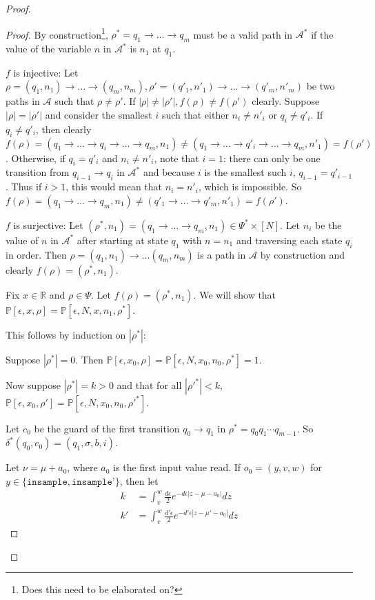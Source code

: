 \documentclass[12pt]{article}
\newcommand{\RR}{\mathbb{R}}
\newcommand{\PP}{\mathbb{P}}
\theoremstyle{definition}
\begin{document}
\begin{proof}
\begin{proof}
	By construction\footnote{Does this need to be elaborated on?}, $\rho^* = q_1\to\ldots\to q_m$ must be a valid path in $\mathcal{A}^*$ if the value of the variable $n$ in $\mathcal{A}^*$ is $n_1$ at $q_1$.

	$f$ is injective: Let $\rho = (q_1, n_1)\to \ldots \to (q_m, n_m), \rho' = (q'_1, n'_1)\to \ldots \to (q'_m, n'_m)$ be two paths in $\mathcal{A}$ such that $\rho \neq \rho'$. If $|\rho| \neq |\rho'|, f(\rho) \neq f(\rho')$ clearly. 
	Suppose $|\rho| = |\rho'|$ and consider the smallest $i$ such that either $n_i \neq n'_i$ or $q_i \neq q'_i$. If $q_i \neq q'_i$, then clearly $f(\rho) = (q_1\to\ldots\to q_i\to \ldots \to q_m, n_1)\neq (q_1\to\ldots\to q'_i\to \ldots \to q_m, n'_1) = f(\rho')$. 
	Otherwise, if $q_i = q'_i$ and $n_i \neq n'_i$, note that $i = 1$: there can only be one transition from $q_{i-1}\to q_{i}$ in $\mathcal{A}^*$ and because $i$ is the smallest such $i$, $q_{i-1} = q'_{i-1}$. Thus if $i > 1$, this would mean that $n_i = n'_i$, which is impossible. So $f(\rho) = (q_1\to\ldots\to q_m, n_1) \neq (q'_1\to\ldots\to q'_m, n'_1) = f(\rho')$.

	$f$ is surjective: Let $(\rho^*, n_1) = (q_1\to\ldots \to q_m, n_1) \in \Psi^* \times [N]$. Let $n_i$ be the value of $n$ in $\mathcal{A}^*$ after starting at state $q_1$ with $n=n_1$ and traversing each state $q_i$ in order. Then $\rho = (q_1, n_1)\to \ldots (q_m, n_m)$ is a path in $\mathcal{A}$ by construction and clearly $f(\rho) = (\rho^*, n_1)$.

	Fix $x\in \RR$ and $\rho \in \Psi$. Let $f(\rho) = (\rho^*, n_1)$. We will show that $\PP[\epsilon, x, \rho] = \PP[\epsilon, N, x, n_1, \rho^*]$.

	This follows by induction on $|\rho^*|$:

	Suppose $|\rho^*| = 0$. Then $\PP[\epsilon, x_0, \rho] = \PP[\epsilon, N, x_0, n_0, \rho^*] = 1$.

	Now suppose $|\rho^*| = k > 0$ and that for all $|\rho'^{*}|<k$, $\PP[\epsilon, x_0, \rho'] = \PP[\epsilon, N, x_0, n_0, \rho'^{*}]$.

	Let $c_0$ be the guard of the first transition $q_0 \to q_1$ in $\rho^* = q_0q_1\cdots q_{m-1}$. So $\delta^*(q_0, c_0) = (q_1, \sigma, b, i)$.

		
	Let $\nu = \mu + a_0$, where $a_0$ is the first input value read. If $o_0 = (y, v, w)$ for $y\in \{\texttt{insample}, \texttt{insample'}\}$, then let \begin{align*}
		k &= \int_{v}^{w}\frac{d\epsilon}{2}e^{-d\epsilon|z-\mu-a_0|}dz\\
		k' &= \int_v^w\frac{d'\epsilon}{2}e^{-d'\epsilon|z-\mu'-a_0|}dz
	\end{align*}


\end{proof}
\end{proof}
\end{document}
